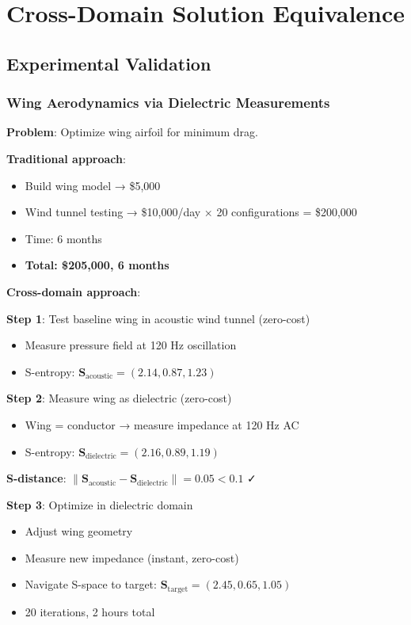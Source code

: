 \documentclass[12pt,a4paper]{article}
\begin{document}
\section{Cross-Domain Solution Equivalence}

\subsection{Experimental Validation}

\subsubsection{Wing Aerodynamics via Dielectric Measurements}

\textbf{Problem}: Optimize wing airfoil for minimum drag.

\textbf{Traditional approach}:
\begin{itemize}
\item Build wing model → \$5,000
\item Wind tunnel testing → \$10,000/day × 20 configurations = \$200,000
\item Time: 6 months
\item \textbf{Total: \$205,000, 6 months}
\end{itemize}

\textbf{Cross-domain approach}:

\textbf{Step 1}: Test baseline wing in acoustic wind tunnel (zero-cost)
\begin{itemize}
\item Measure pressure field at 120 Hz oscillation
\item S-entropy: $\mathbf{S}_{\text{acoustic}} = (2.14, 0.87, 1.23)$
\end{itemize}

\textbf{Step 2}: Measure wing as dielectric (zero-cost)
\begin{itemize}
\item Wing = conductor → measure impedance at 120 Hz AC
\item S-entropy: $\mathbf{S}_{\text{dielectric}} = (2.16, 0.89, 1.19)$
\end{itemize}

\textbf{S-distance}: $\|\mathbf{S}_{\text{acoustic}} - \mathbf{S}_{\text{dielectric}}\| = 0.05 < 0.1$ ✓

\textbf{Step 3}: Optimize in dielectric domain
\begin{itemize}
\item Adjust wing geometry
\item Measure new impedance (instant, zero-cost)
\item Navigate S-space to target: $\mathbf{S}_{\text{target}} = (2.45, 0.65, 1.05)$
\item 20 iterations, 2 hours total
\end{itemize}
\end{document}
